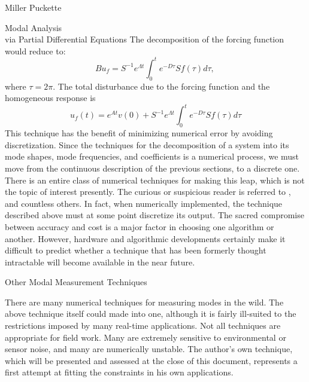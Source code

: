 \documentclass[a4paper,10pt]{report}
\numberwithin{equation}{section}
\begin{document}
\begin{chapter}{Miller Puckette}
\begin{section}{Modal Analysis \\via Partial Differential Equations}
The decomposition of the forcing function would reduce to:
\begin{equation}
Bu_f = S^{-1} e^{\Lambda t} \int_0^t e^{-D \tau} S f(\tau) d\tau \text{, }
\end{equation}
where $\tau = 2\pi$. The total disturbance due to the forcing function and the homogeneous response is
\begin{equation}\label{residual_regress}
u_f(t) = e^{At}v(0) + S^{-1}e^{\Lambda t} \int_0^t e^{-D \tau} S f(\tau) d\tau
\end{equation}
This technique has the benefit of minimizing numerical error by avoiding discretization. Since the techniques for the decomposition of a system into its mode shapes, mode frequencies, and coefficients is a numerical process, we must move from the continuous description of the previous sections, to a discrete one. There is an entire class of numerical techniques for making this leap, which is not the topic of interest presently. The curious or suspicious reader is referred to \cite[p.~317]{Strang2009} \cite{Press1988} \cite{Reid1992} \cite{Courant1937}, and countless others. In fact, when numerically implemented, the technique described above must at some point discretize its output. The sacred compromise between accuracy and cost is a major factor in choosing one algorithm or another. However, hardware and algorithmic developments certainly make it difficult to predict whether a technique that has been formerly thought intractable will become available in the near future. 
\end{section}
\begin{section}{Other Modal Measurement Techniques}\label{sec:modes_other}

There are many numerical techniques for measuring modes in the wild. The above technique itself could made into one, although it is fairly ill-suited to the restrictions imposed by many real-time applications. Not all techniques are appropriate for field work. Many are extremely sensitive to environmental or sensor noise, and many are numerically unstable. The author's own technique, which will be presented and assessed at the close of this document, represents a first attempt at fitting the constraints in his own applications. 


\end{section}
\end{chapter}
\end{document}
